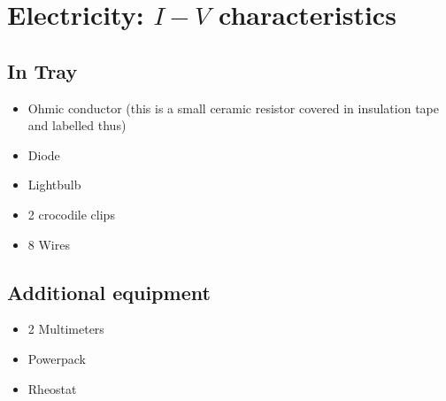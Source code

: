 \section{Electricity: $I-V$ characteristics}

\subsection{In Tray}

\begin{itemize}
\item Ohmic conductor (this is a small ceramic resistor covered in insulation tape and labelled thus)
\item Diode
\item Lightbulb
\item 2 crocodile clips
\item 8 Wires
\end{itemize}


\subsection{Additional equipment}

\begin{itemize}
\item 2 Multimeters
\item Powerpack
\item Rheostat
\end{itemize}
